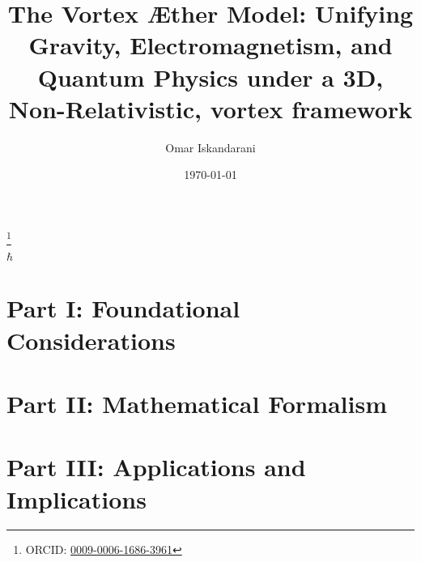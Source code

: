 \documentclass[aps,preprint,superscriptaddress]{revtex4}
\begin{document}
\author{Omar Iskandarani}
\title{The Vortex Æther Model: Unifying Gravity, Electromagnetism, and Quantum Physics under a 3D, Non-Relativistic, vortex framework}
\date{\today}
\thanks{ORCID: \href{https://orcid.org/0009-0006-1686-3961}{0009-0006-1686-3961}}

$\hbar$

\newpage

\section*{Part I: Foundational Considerations}\label{sec:Part-1}

\newpage

\newpage

\newpage

\section*{Part II: Mathematical Formalism}\label{sec:Part-2}

\newpage

\newpage

\newpage

\newpage

\newpage

\newpage

\newpage

\newpage

\newpage

\newpage

\newpage


\section*{Part III: Applications and Implications}\label{sec:Part-3}

\newpage

\newpage

\newpage





\newpage
\appendix \label{sec:Part-4}
\label{appendix:1}
\newpage
\label{appendix:2}
\newpage
\label{appendix:maxwell_appendix}
\newpage
\label{appendix:TimeDilation}
\newpage
\label{appendix:5}
\newpage
\label{appendix:6}
\newpage
\label{appendix:alpha}
\newpage
\label{appendix:8}
\newpage
\label{appendix:9}
\newpage
\label{appendix:10}
\newpage
\label{appendix:11}
\newpage
\end{document}
